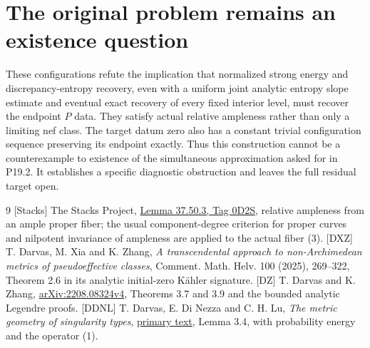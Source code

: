 \documentclass[11pt]{article}
\begin{document}
\section{The original problem remains an existence question}
These configurations refute the implication that normalized strong
energy and discrepancy-entropy recovery, even with a uniform joint
analytic entropy slope estimate and eventual exact recovery of every
fixed interior level, must recover the endpoint $P$ data. They satisfy
actual relative ampleness rather than only a limiting nef class.
The target datum zero also has a constant trivial configuration
sequence preserving its endpoint exactly. Thus this construction cannot
be a counterexample to existence of the simultaneous approximation
asked for in P19.2. It establishes a specific diagnostic obstruction
and leaves the full residual target open.

\begin{thebibliography}{9}
[Stacks] The Stacks Project,
\href{https://stacks.math.columbia.edu/tag/0D2S}{Lemma 37.50.3,
Tag 0D2S}, relative ampleness from an ample proper fiber; the usual
component-degree criterion for proper curves and nilpotent invariance
of ampleness are applied to the actual fiber (3).
[DXZ] T. Darvas, M. Xia and K. Zhang,
\emph{A transcendental approach to non-Archimedean metrics of
pseudoeffective classes}, Comment. Math. Helv. 100 (2025), 269--322,
Theorem 2.6 in its analytic initial-zero K\"ahler signature.
[DZ] T. Darvas and K. Zhang,
\href{https://arxiv.org/pdf/2208.08324v4}{arXiv:2208.08324v4},
Theorems 3.7 and 3.9 and the bounded analytic Legendre proofs.
[DDNL] T. Darvas, E. Di Nezza and C. H. Lu,
\emph{The metric geometry of singularity types},
\href{https://arxiv.org/pdf/1909.00839}{primary text},
Lemma 3.4, with probability energy and the operator (1).
\end{thebibliography}
\end{document}
